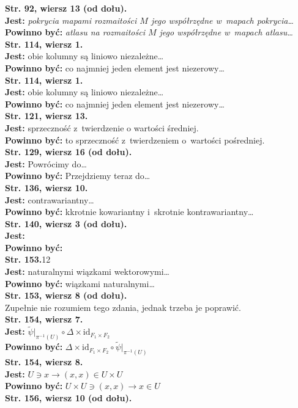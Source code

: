 \documentclass[a4paper,11pt]{article}
\newcommand{\mr}{\mathrm}
\newcommand{\ra}{\rightarrow}
\newcommand{\ti}{\times}
\newcommand{\id}{\mr{id}}
\newcommand{\Del}{\Delta}
\newcommand{\wt}{\widetilde}
\newcommand{\tb}{\textbf}
\newcommand{\Str}[1]{\tb{Str. #1.}}
\newcommand{\StrWg}[2]{\tb{Str. #1, wiersz #2.}}
\newcommand{\StrWd}[2]{\tb{Str. #1, wiersz #2 (od dołu).}}
\newcommand{\Jest}{\tb{Jest: }}
\newcommand{\Pow}{\tb{Powinno być: }}
\begin{document}
\StrWd{92}{13} \\
\Jest \emph{pokrycia mapami rozmaitości $M$ jego współrzędne
  w~mapach pokrycia\ldots} \\
\Pow \emph{atlasu na rozmaitości $M$ jego współrzędne
  w~mapach atlasu\ldots} \\
\StrWg{114}{1} \\
\Jest obie kolumny są liniowo niezależne\ldots \\
\Pow co najmniej jeden element jest niezerowy\ldots \\
\StrWg{114}{1} \\
\Jest obie kolumny są liniowo niezależne\ldots \\
\Pow co najmniej jeden element jest niezerowy\ldots \\
\StrWg{121}{13} \\
\Jest sprzeczność z~twierdzenie o wartości średniej.\\
\Pow to sprzeczność z~twierdzeniem o~wartości pośredniej.\\
\StrWd{129}{16} \\
\Jest Powrócimy do\ldots\\
\Pow Przejdziemy teraz do\ldots\\
\StrWg{136}{10} \\
\Jest contrawariantny\ldots\\
\Pow k\dywiz krotnie kowariantny i~s\dywiz krotnie kontrawariantny\ldots \\
\StrWd{140}{3} \\
\Jest \\
\Pow \\
\Str{153}{12} \\
\Jest naturalnymi wiązkami wektorowymi\ldots\\
\Pow wiązkami naturalnymi\ldots \\
\StrWd{153}{8} \\
Zupełnie nie rozumiem tego zdania, jednak trzeba je poprawić. \\
\StrWg{154}{7} \\
\Jest $\wt{ \psi }\Big|_{ \pi^{ -1 }( U ) } \circ \Del \ti
\id_{ F_{ 1 } \ti F_{ 2 } }$ \\
\Pow $\Del \ti \id_{ F_{ 1 } \ti F_{ 2 } } \circ
\wt{ \psi }\Big|_{ \pi^{ -1 }( U ) }$ \\
\StrWg{154}{8} \\
\Jest $U \ni x \ra ( x, x ) \in U \ti U$ \\
\Pow $U \ti U \ni ( x, x ) \ra x \in U$ \\
\StrWd{156}{10} \\
\end{document}
